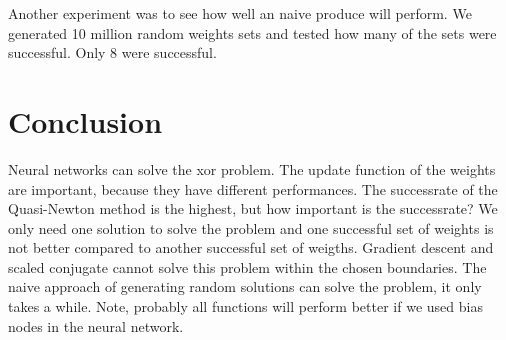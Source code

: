 \documentclass{article}
\begin{document}
Another experiment was to see how well an naive produce will perform. We generated 10 million random weights sets and tested how many of the sets were successful. Only 8 were successful. 

\section{Conclusion}
Neural networks can solve the xor problem. The update function of the weights are important, because they have different performances. The successrate of the Quasi-Newton method is the highest, but how important is the successrate? We only need one solution to solve the problem and one successful set of weights is not better compared to another successful set of weigths. Gradient descent and scaled conjugate cannot solve this problem within the chosen boundaries. The naive approach of generating random solutions can solve the problem, it only takes a while. Note, probably all functions will perform better if we used bias nodes in the neural network.
\end{document}
